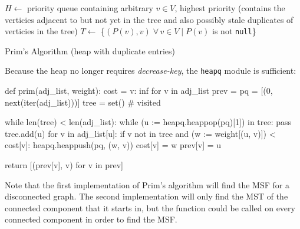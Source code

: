 \documentclass[12pt, titlepage]{article}
\begin{document}
\begin{algorithm}[H]
  \SetAlgoLined
  \DontPrintSemicolon
  $H \longleftarrow$\hspace{0.5mm} priority queue containing arbitrary $v\in V$, highest priority\;
  \hspace{13mm}(contains the verticies adjacent to but not yet in the tree and\;
  \hspace{13mm}also possibly stale duplicates of verticies in the tree)\;
  $T \longleftarrow$\hspace{0.5mm} \{$(P(v), v)\;\forall\,v\in V\mid P(v)$ is not \texttt{null}\}\;
  \;
    \caption{Prim's Algorithm (heap with duplicate entries)}
\end{algorithm} \medskip

Because the heap no longer requires \textit{decrease-key}, the \texttt{heapq} module is sufficient: \medskip

\begin{python}
def prim(adj_list, weight):
    cost = {v: inf for v in adj_list}
    prev = {}
    pq = [(0, next(iter(adj_list)))]
    tree = set()  # visited

    while len(tree) < len(adj_list):
        while (u := heapq.heappop(pq)[1]) in tree: pass
        tree.add(u)
        for v in adj_list[u]:
            if v not in tree and (w := weight[(u, v)]) < cost[v]:
                heapq.heappush(pq, (w, v))
                cost[v] = w
                prev[v] = u
        
    return [(prev[v], v) for v in prev]
\end{python}

Note that the first implementation of Prim's algorithm will find the MSF for a disconnected graph. The second implementation will only find the MST of the connected component that it starts in, but the function could be called on every connected component in order to find the MSF. \\
\end{document}
